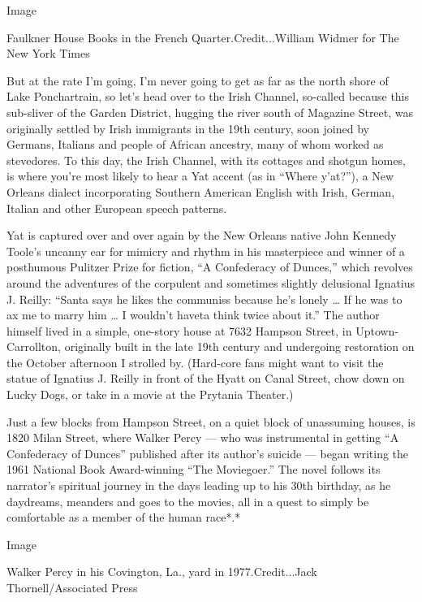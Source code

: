 Image

Faulkner House Books in the French Quarter.Credit...William Widmer for
The New York Times

But at the rate I'm going, I'm never going to get as far as the north
shore of Lake Ponchartrain, so let's head over to the Irish Channel,
so-called because this sub-sliver of the Garden District, hugging the
river south of Magazine Street, was originally settled by Irish
immigrants in the 19th century, soon joined by Germans, Italians and
people of African ancestry, many of whom worked as stevedores. To this
day, the Irish Channel, with its cottages and shotgun homes, is where
you're most likely to hear a Yat accent (as in ``Where y'at?''), a New
Orleans dialect incorporating Southern American English with Irish,
German, Italian and other European speech patterns.

Yat is captured over and over again by the New Orleans native John
Kennedy Toole's uncanny ear for mimicry and rhythm in his masterpiece
and winner of a posthumous Pulitzer Prize for fiction, ``A Confederacy
of Dunces,'' which revolves around the adventures of the corpulent and
sometimes slightly delusional Ignatius J. Reilly: ``Santa says he likes
the communiss because he's lonely \ldots{} If he was to ax me to marry
him \ldots{} I wouldn't haveta think twice about it.'' The author
himself lived in a simple, one-story house at 7632 Hampson Street, in
Uptown-Carrollton, originally built in the late 19th century and
undergoing restoration on the October afternoon I strolled by.
(Hard-core fans might want to visit the statue of Ignatius J. Reilly in
front of the Hyatt on Canal Street, chow down on Lucky Dogs, or take in
a movie at the Prytania Theater.)

Just a few blocks from Hampson Street, on a quiet block of unassuming
houses, is 1820 Milan Street, where Walker Percy --- who was
instrumental in getting ``A Confederacy of Dunces'' published after its
author's suicide --- began writing the 1961 National Book Award-winning
``The Moviegoer.'' The novel follows its narrator's spiritual journey in
the days leading up to his 30th birthday, as he daydreams, meanders and
goes to the movies, all in a quest to simply be comfortable as a member
of the human race*.*

Image

Walker Percy in his Covington, La., yard in 1977.Credit...Jack
Thornell/Associated Press

